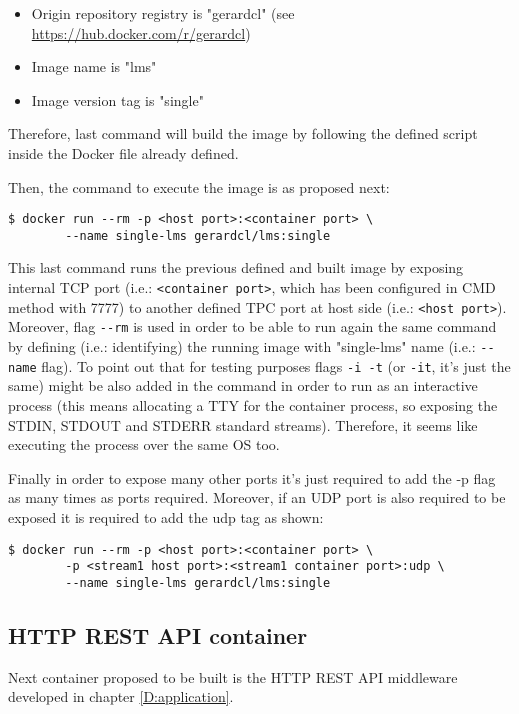 \begin{itemize}
\item Origin repository registry is "gerardcl" (see \url{https://hub.docker.com/r/gerardcl})
\item Image name is "lms"
\item Image version tag is "single"
\end{itemize}

Therefore, last command will build the image by following the defined script inside the Docker file already defined.

Then, the command to execute the image is as proposed next:

\begin{verbatim}
$ docker run --rm -p <host port>:<container port> \
		--name single-lms gerardcl/lms:single
\end{verbatim}

This last command runs the previous defined and built image by exposing internal TCP port (i.e.: \verb|<container port>|, which has been configured in CMD method with 7777) to another defined TPC port at host side (i.e.: \verb|<host port>|). Moreover, flag \verb|--rm| is used in order to be able to run again the same command by defining (i.e.: identifying) the running image with "single-lms" name (i.e.: \verb|--name| flag). To point out that for testing purposes flags \verb|-i -t| (or \verb|-it|, it's just the same) might be also added in the command in order to run as an interactive process (this means allocating a TTY for the container process, so exposing the STDIN, STDOUT and STDERR standard streams). Therefore, it seems like executing the process over the same OS too.

Finally in order to expose many other ports it's just required to add the -p flag as many times as ports required. Moreover, if an UDP port is also required to be exposed it is required to add the udp tag as shown:

\begin{verbatim}
$ docker run --rm -p <host port>:<container port> \
		-p <stream1 host port>:<stream1 container port>:udp \
		--name single-lms gerardcl/lms:single
\end{verbatim}


\subsection{HTTP REST API container}

Next container proposed to be built is the HTTP REST API middleware developed in chapter \ref{D:application}.  

